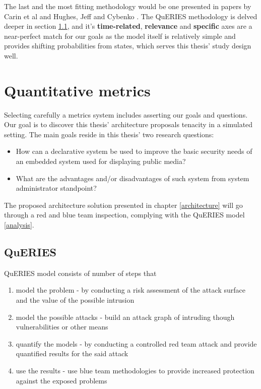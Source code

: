 The last and the most fitting methodology would be one presented in papers by  Carin et al and Hughes, Jeff and Cybenko \cite{carin2008cybersecurity} \cite{hughes2013quantitative}. The QuERIES methodology is delved deeper in section \ref{queries}, and it's \textbf{time-related}, \textbf{relevance} and \textbf{specific} axes are a near-perfect match for our goals as the model itself is relatively simple and provides shifting probabilities from states, which serves this thesis' study design well.


\section{Quantitative metrics}

Selecting carefully a metrics system includes asserting our goals and questions. Our goal is to discover this thesis' architecture proposals tenacity in a simulated setting. The main goals reside in this thesis' two research questions:
\begin{itemize}
\item How can a declarative system be used to improve the basic security needs of an embedded system used for displaying public media?
\item What are the advantages and/or disadvantages of such system from system administrator standpoint?
\end{itemize}

The proposed architecture solution presented in chapter \ref{architecture} will go through a red and blue team inspection, complying with the QuERIES model \ref{analysis}.

\subsection{QuERIES} \label{queries}
QuERIES model consists of number of steps that

\begin{enumerate}
  \item model the problem - by conducting a risk assessment of the attack surface and the value of the possible intrusion
  \item model the possible attacks - build an attack graph of intruding though vulnerabilities or other means
  \item quantify the models  - by conducting a controlled red team attack and provide quantified results for the said attack
  \item use the results - use blue team methodologies to provide increased protection against the exposed problems
  
\end{enumerate}

